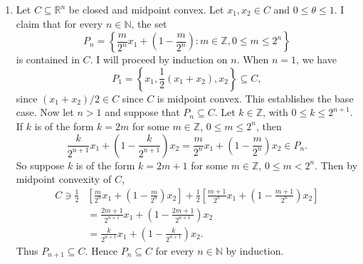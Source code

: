 \documentclass[letterpaper,12pt]{article}
\begin{document}
\begin{enumerate}
\item Let $C \subseteq \mathbb{R}^n$ be closed and midpoint
  convex. Let $x_1, x_2 \in C$ and $0 \leq \theta \leq 1$. I claim
  that for every $n \in \mathbb{N}$, the set
  \begin{equation*}
    P_n = \left \{ \frac{m}{2^n} x_1 + \left ( 1 - \frac{m}{2^n} \right )
      : m \in \mathbb{Z}, 0 \leq m \leq 2^n \right \}
  \end{equation*}
  is contained in $C$. I will proceed by induction on $n$. When
  $n = 1$, we have
  \begin{equation*}
    P_1 = \left \{ x_1, \frac{1}{2} (x_1 + x_2), x_2 \right \} \subseteq C,
  \end{equation*}
  since $(x_1 + x_2) / 2 \in C$ since $C$ is midpoint convex. This
  establishes the base case. Now let $n > 1$ and suppose that
  $P_n \subseteq C$. Let $k \in \mathbb{Z}$, with
  $0 \leq k \leq 2^{n+1}$. If $k$ is of the form $k = 2m$ for some
  $m \in \mathbb{Z}$, $0 \leq m \leq 2^n$, then
  \begin{equation*}
    \frac{k}{2^{n+1}} x_1 + \left ( 1 - \frac{k}{2^{n+1}} \right ) x_2
      = \frac{m}{2^n} x_1 + \left ( 1 - \frac{m}{2^n} \right ) x_2 \in P_n.
  \end{equation*}
  So suppose $k$ is of the form $k = 2m + 1$ for some
  $m \in \mathbb{Z}$, $0 \leq m < 2^n$. Then by midpoint convexity of
  $C$,
  \begin{align*}
    C \ni \frac{1}{2}& \left [ \frac{m}{2^n} x_1 +
      \left ( 1 - \frac{m}{2^n} \right ) x_2 \right ] +
    \frac{1}{2} \left [ \frac{m + 1}{2^n} x_1 +
      \left ( 1 - \frac{m + 1}{2^n} \right ) x_2 \right ] \\
    &= \frac{2m + 1}{2^{n+1}} x_1 +
         \left ( 1 - \frac{2m + 1}{2^{n+1}} \right ) x_2 \\
    &= \frac{k}{2^{n+1}} x_1 + \left ( 1 - \frac{k}{2^{n+1}} \right ) x_2.
  \end{align*}
  Thus $P_{n+1} \subseteq C$. Hence $P_n \subseteq C$ for every
  $n \in \mathbb{N}$ by induction.


\end{enumerate}
\end{document}
